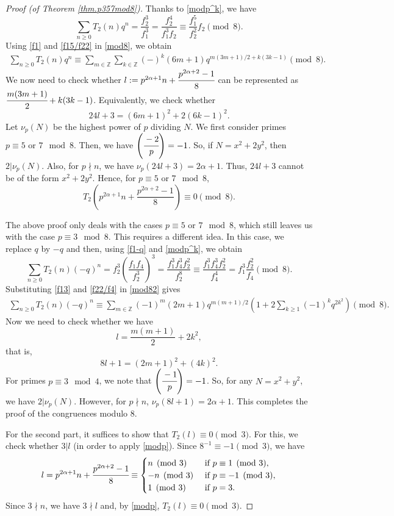 \documentclass[10pt,a4paper]{amsart}
\begin{document}
\begin{proof}[Proof (of Theorem \ref{thm.p357mod8})]
 Thanks to \eqref{modp^k}, we have 
\begin{equation}\label{mod8}
    \sum_{n\geq0}T_2(n)q^n=\frac{f_2^3}{f_1^3}=\frac{f_2^4}{f_1^3f_2}\equiv\frac{f_1^5}{f_2^2}f_2 \pmod8.
\end{equation}
Using \eqref{f1} and \eqref{f15/f22} in \eqref{mod8}, we obtain 
\begin{align*}
    \sum_{n\geq0}T_2(n)q^n\equiv \sum_{m\in\mathbb{Z}}\sum_{k\in\mathbb{Z}}(-)^k(6m+1)q^{m(3m+1)/2+k(3k-1)} \pmod 8.
\end{align*}
We now need to check whether $l:=p^{2\alpha+1}n+\cfrac{p^{2\alpha+2}-1}{8}$ can be represented as $\cfrac{m(3m+1)}{2}+k(3k-1)$. Equivalently, we check whether $$24l+3=(6m+1)^2+2(6k-1)^2.$$ 
Let $\nu_p(N)$ be the highest power of $p$ dividing $N$. We first consider primes $p\equiv5\text{ or }7\mod 8$. Then, we have $\left(\cfrac{-2}{p}\right)=-1$. So, if $N=x^2+2y^2$, then $2|\nu_p(N)$. Also, for $p\nmid n$, we have $\nu_p(24l+3)=2\alpha+1$. Thus, $24l+3$ cannot be of the form $x^2+2y^2$. Hence, for $p\equiv5 \text{ or } 7 \mod 8$,
$$T_2\left(p^{2\alpha+1}n+\frac{p^{2\alpha+2}-1}{8}\right)\equiv 0\pmod{8}.$$

The above proof only deals with the cases $p\equiv5 \text{ or } 7 \mod 8$, which still leaves us with the case $p\equiv3 \mod 8$.  This requires a different idea.  In this case, we replace 
$q$ by $-q$ and then, using \eqref{f1-q} and \eqref{modp^k}, we obtain 
\begin{equation} \label{mod82}
    \sum_{n\geq0}T_2(n)(-q)^n =f_2^3\left(\frac{f_1f_4}{f_2^3}\right)^3=\frac{f_1^3f_4^3f_2^2}{f_2^8}\equiv \frac{f_1^3f_4^3f_2^2}{f_4^4}= f_1^3\frac{f_2^2}{f_4} \pmod{8}.
\end{equation}
Substituting \eqref{f13} and \eqref{f22/f4} in \eqref{mod82} gives
\begin{align*}
   \sum_{n\geq0}T_2(n)(-q)^n\equiv \sum_{m\in\mathbb{Z}}(-1)^m(2m+1)q^{m(m+1)/2}\left(1+2\sum_{k\geq 1}(-1)^kq^{2k^2}\right) \pmod{8}.
\end{align*}
Now we need to check whether we have 
$$l=\frac{m(m+1)}{2}+2k^2,$$
that is, $$8l+1=(2m+1)^2+(4k)^2.$$
For primes $p\equiv 3\mod 4$, we note that $\left(\cfrac{-1}{p}\right)=-1$. So, for any $N=x^2+y^2$, we have $2|\nu_p(N)$. However, for $p\nmid n$,  $\nu_p(8l+1)=2\alpha+1$. This completes the proof of the congruences modulo 8.

For the second part, it suffices to show that $T_2(l)\equiv 0\pmod{3}$. For this, we check whether $3|l$ (in order to apply \eqref{modp}). Since $8^{-1}\equiv-1 \pmod 3$, we have 
\[l=p^{2\alpha+1}n+\cfrac{p^{2\alpha+2}-1}{8}\equiv
\begin{cases}n \pmod{3} &\text{ if } p\equiv1\pmod{3},\\
-n \pmod{3} & \text{ if } p\equiv -1\pmod {3},\\
1 \pmod{3} & \text{ if } p=3.
\end{cases}
\]
Since $3\nmid n$, we have $3\nmid l$ and, by \eqref{modp}, $T_2(l)\equiv0\pmod 3$.

\end{proof}
\end{document}
